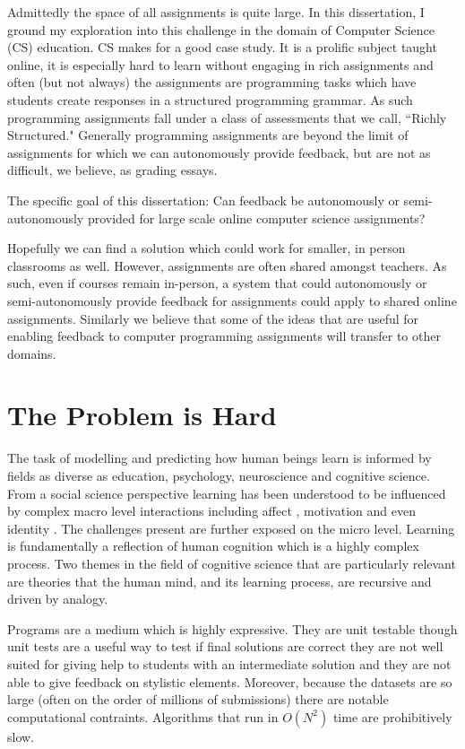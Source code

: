 Admittedly the space of all assignments is quite large. In this dissertation, I ground my exploration into this challenge in the domain of Computer Science (CS) education. CS makes for a good case study. It is a prolific subject taught online, it is especially hard to learn without engaging in rich assignments and often (but not always) the assignments are programming tasks which have students create responses in a structured programming grammar. As such programming assignments fall under a class of assessments that we call, ``Richly Structured." Generally programming assignments are beyond the limit of assignments for which we can autonomously provide feedback, but are not as difficult, we believe, as grading essays.

\begin{mdframed}
The specific goal of this dissertation: Can feedback be autonomously or semi-autonomously provided for large scale online computer science assignments?
\end{mdframed}

Hopefully we can find a solution which could work for smaller, in person classrooms as well. However, assignments are often shared amongst teachers. As such, even if courses remain in-person, a system that could autonomously or semi-autonomously provide feedback for assignments could apply to shared online assignments. Similarly we believe that some of the ideas that are useful for enabling feedback to computer programming assignments will transfer to other domains.	

\section{The Problem is Hard}

The task of modelling and predicting how human beings learn is informed by fields as diverse
as education, psychology, neuroscience and cognitive science. From a social science perspective
learning has been understood to be influenced by complex macro level interactions including affect \cite{}
, motivation \cite{} and even identity \cite{}. The challenges present are further exposed on the micro
level. Learning is fundamentally a reflection of human cognition which is a highly complex process.
Two themes in the field of cognitive science that are particularly relevant are theories that the human
mind, and its learning process, are recursive and driven by analogy.

Programs are a medium which is highly expressive. They are unit testable though unit tests are a useful way to test if final solutions are correct they are not well suited for giving help to students with an intermediate solution and they are not able to give feedback on stylistic elements. Moreover, because the datasets are so large (often on the order of millions of submissions) there are notable computational contraints. Algorithms that run in $O(N^2)$ time are prohibitively slow.

